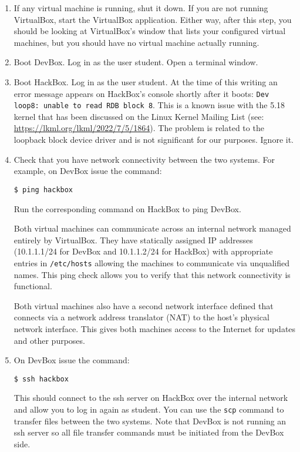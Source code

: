 \documentclass[twocolumn]{article}
\begin{document}
\begin{enumerate}

\item If any virtual machine is running, shut it down. If you are not running VirtualBox, start
  the VirtualBox application. Either way, after this step, you should be looking at VirtualBox's
  window that lists your configured virtual machines, but you should have no virtual machine
  actually running.

\item Boot DevBox. Log in as the user student. Open a terminal window.

\item Boot HackBox. Log in as the user student. At the time of this writing an error message
  appears on HackBox's console shortly after it boots: \texttt{Dev loop8: unable to read RDB
    block 8}. This is a known issue with the 5.18 kernel that has been discussed on the Linux
  Kernel Mailing List (see: \url{https://lkml.org/lkml/2022/7/5/1864}). The problem is related
  to the loopback block device driver and is not significant for our purposes. Ignore it.

\item Check that you have network connectivity between the two systems. For example, on DevBox
  issue the command:
\begin{Verbatim}
$ ping hackbox
\end{Verbatim}
  Run the corresponding command on HackBox to ping DevBox.

  Both virtual machines can communicate across an internal network managed entirely by
  VirtualBox. They have statically assigned IP addresses (10.1.1.1/24 for DevBox and 10.1.1.2/24
  for HackBox) with appropriate entries in \texttt{/etc/hosts} allowing the machines to
  communicate via unqualified names. This ping check allows you to verify that this network
  connectivity is functional.

  Both virtual machines also have a second network interface defined that connects via a network
  address translator (NAT) to the host's physical network interface. This gives both machines
  access to the Internet for updates and other purposes.

\item On DevBox issue the command:
\begin{Verbatim}
$ ssh hackbox
\end{Verbatim}
  This should connect to the ssh server on HackBox over the internal network and allow you to
  log in again as student. You can use the \texttt{scp} command to transfer files between the
  two systems. Note that DevBox is not running an ssh server so all file transfer commands must
  be initiated from the DevBox side.


\end{enumerate}
\end{document}
